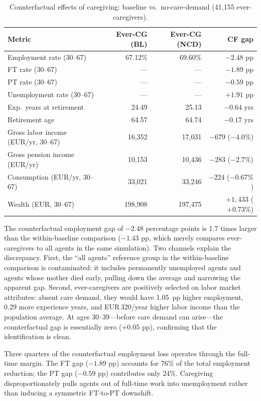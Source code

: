 \begin{table}[htbp]
  \centering
  \caption{Counterfactual effects of caregiving: baseline vs.\ no-care-demand (41,155 ever-caregivers).}
  \label{tab:counterfactual_effects_ncd}
  \small
  \begin{tabular}{lrrr}
    \toprule
    Metric & Ever-CG (BL) & Ever-CG (NCD) & CF gap \\
    \midrule
    Employment rate (30--67) & 67.12\% & 69.60\% & $-2.48$ pp \\
    \quad FT rate (30--67) & --- & --- & $-1.89$ pp \\
    \quad PT rate (30--67) & --- & --- & $-0.59$ pp \\
    \quad Unemployment rate (30--67) & --- & --- & $+1.91$ pp \\
    \addlinespace
    Exp.\ years at retirement & 24.49 & 25.13 & $-0.64$ yrs \\
    Retirement age & 64.57 & 64.74 & $-0.17$ yrs \\
    \addlinespace
    Gross labor income (EUR/yr, 30--67) & 16,352 & 17,031 & $-679$ ($-4.0\%$) \\
    Gross pension income (EUR/yr) & 10,153 & 10,436 & $-283$ ($-2.7\%$) \\
    Consumption (EUR/yr, 30--67) & 33,021 & 33,246 & $-224$ ($-0.67\%$) \\
    Wealth (EUR, 30--67) & 198,908 & 197,475 & $+1{,}433$ ($+0.73\%$) \\
    \bottomrule
  \end{tabular}
\end{table}

The counterfactual employment gap of $-2.48$ percentage points is 1.7 times larger than the within-baseline comparison ($-1.43$ pp, which merely compares ever-caregivers to all agents in the same simulation). Two channels explain the discrepancy. First, the ``all agents'' reference group in the within-baseline comparison is contaminated: it includes permanently unemployed agents and agents whose mother died early, pulling down the average and narrowing the apparent gap. Second, ever-caregivers are positively selected on labor market attributes: absent care demand, they would have 1.05~pp higher employment, 0.29 more experience years, and EUR\,320/year higher labor income than the population average. At ages 30--39---before care demand can arise---the counterfactual gap is essentially zero ($+0.05$ pp), confirming that the identification is clean.

Three quarters of the counterfactual employment loss operates through the full-time margin. The FT gap ($-1.89$ pp) accounts for 76\% of the total employment reduction; the PT gap ($-0.59$ pp) contributes only 24\%. Caregiving disproportionately pulls agents out of full-time work into unemployment rather than inducing a symmetric FT-to-PT downshift.


